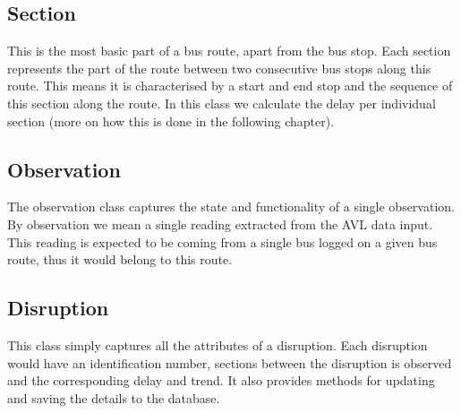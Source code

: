 \subsection{Section}
This is the most basic part of a bus route, apart from the bus stop. Each section represents the part of the route between two consecutive bus stops along this route. This means it is characterised by a start and end stop and the sequence of this section along the route. In this class we calculate the delay per individual section (more on how this is done in the following chapter).

\subsection{Observation}
The observation class captures the state and functionality of a single observation. By observation we mean a single reading extracted from the AVL data input. This reading is expected to be coming from a single bus logged on a given bus route, thus it would belong to this route. 

\subsection{Disruption}
This class simply captures all the attributes of a disruption. Each disruption would have an identification number, sections between the disruption is observed and the corresponding delay and trend. It also provides methods for updating and saving the details to the database.


